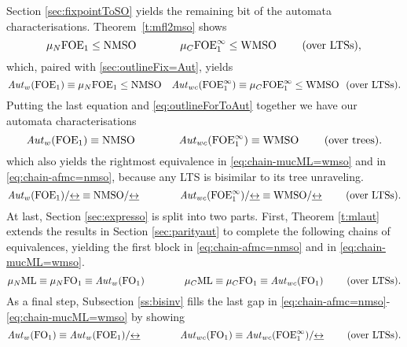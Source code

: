 Section \ref{sec:fixpointToSO} yields the remaining bit of the automata characterisations. Theorem~\ref{t:mfl2mso} shows
\[ \mu_{N}\mathrm{FOE}_1 \leq \mathrm{NMSO} \qquad \qquad \mu_{C}\mathrm{FOE}^{\infty}_1 \leq \mathrm{WMSO}  \qquad \text{ (over LTSs)},\]
which, paired with \eqref{sec:outlineFix=Aut}, yields
\begin{equation*}%
	 \AutW(\ofoe) \equiv \mu_{N}\ofoe \leq \nmso \quad \AutWC(\ofoei) \equiv \mu_{C}\ofoei \leq \wmso \ \text{ (over LTSs)}.
\end{equation*}
 Putting the last equation and \eqref{eq:outlineForToAut} together we have our automata characterisations
 \begin{equation*}
 \mathit{Aut}_{w}(\mathrm{FOE}_1) \equiv \mathrm{NMSO} \qquad \qquad  {\mathit{Aut}_{wc}(\ensuremath{\mathrm{FOE}^{\infty}_1})} \equiv \mathrm{WMSO} \qquad \text{ (over trees)}.
 \end{equation*}
 which also yields the rightmost equivalence in \eqref{eq:chain-mucML=wmso} and in \eqref{eq:chain-afmc=nmso}, because any LTS is bisimilar to its tree unraveling.
  \begin{equation*}
 \mathit{Aut}_{w}(\mathrm{FOE}_1)/{\mathrel{\underline{\leftrightarrow}}} \equiv \mathrm{NMSO}/{\mathrel{\underline{\leftrightarrow}}} \qquad \qquad {\mathit{Aut}_{wc}(\ensuremath{\mathrm{FOE}^{\infty}_1})}/{\mathrel{\underline{\leftrightarrow}}} \equiv \mathrm{WMSO}/{\mathrel{\underline{\leftrightarrow}}} \qquad \text{ (over LTSs)}.
 \end{equation*}
At last, Section \ref{sec:expresso} is split into two parts. 
First, Theorem \ref{t:mlaut} extends the results in Section \ref{sec:parityaut} 
to complete the following chains of equivalences, yielding the first block 
in \eqref{eq:chain-afmc=nmso} and in \eqref{eq:chain-mucML=wmso}.
\[ 
\mu_{N}\mathrm{ML} \equiv \mu_{N}\mathrm{FO}_1 \equiv \mathit{Aut}_{w}(\mathrm{FO}_1) \qquad \qquad 
\mu_{C}\mathrm{ML} \equiv \mu_{C}\mathrm{FO}_1 \equiv \mathit{Aut}_{wc}(\mathrm{FO}_1)  \qquad \text{ (over LTSs)}. 
\]
As a final step, Subsection \ref{ss:bisinv} fills the last gap 
in \eqref{eq:chain-afmc=nmso}-\eqref{eq:chain-mucML=wmso} by showing
\[ 
\mathit{Aut}_{w}(\mathrm{FO}_1) \equiv \mathit{Aut}_{w}(\mathrm{FOE}_1)/{\mathrel{\underline{\leftrightarrow}}} \qquad \qquad 
\mathit{Aut}_{wc}(\mathrm{FO}_1) \equiv \mathit{Aut}_{wc}(\mathrm{FOE}^{\infty}_1)/{\mathrel{\underline{\leftrightarrow}}} \qquad \text{ (over LTSs)}.
\]

  
